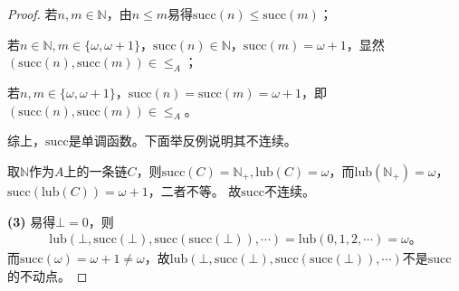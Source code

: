 \documentclass[12pt]{article}
\newcommand{\N}{\mathbb{N}}
\newcommand{\suc}{\textrm{succ}}
\newcommand{\lub}{\textrm{lub}}
\begin{document}
\begin{proof}
        若$n,m\in\N$，由$n\leq m$易得$\suc(n)\leq\suc(m)$；

        若$n\in\N,m\in\{\omega,\omega+1\}$，$\suc(n)\in\N$，$\suc(m)=\omega+1$，显然$(\suc(n),\suc(m))\in\leq_A$；

        若$n,m\in\{\omega,\omega+1\}$，$\suc(n)=\suc(m)=\omega+1$，即$(\suc(n),\suc(m))\in\leq_A$。

        综上，$\suc$是单调函数。下面举反例说明其不连续。

        取$\N$作为$A$上的一条链$C$，则$\suc(C)=\N_+,\lub(C)=\omega$，而$\lub(\N_+)=\omega$，$\suc(\lub(C))=\omega+1$，二者不等。
        故$\suc$不连续。

      \textbf{(3)} 易得$\bot=0$，则
        \begin{gather*}
          \lub(\bot,\suc(\bot),\suc(\suc(\bot)),\cdots)=\lub(0,1,2,\cdots)=\omega。
        \end{gather*}
        而$\suc(\omega)=\omega+1\neq\omega$，故$\lub(\bot,\suc(\bot),\suc(\suc(\bot)),\cdots)$不是$\suc$的不动点。
    \end{proof}
\end{document}
